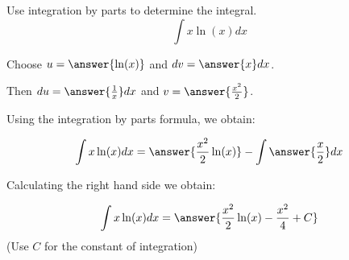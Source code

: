 \documentclass{ximera}
\author{Jason Miller}
\begin{document}
\begin{exercise}
Use integration by parts to determine the integral.
\[
\int x \ln(x) dx 
\]


Choose $u=\answer{ \ln(x) }$ and $dv=\answer{x } dx$. 

Then $du= \answer{ \frac{1}{x} } dx$ and $v= \answer{\frac{x^{2}}{2}}$.

Using the integration by parts formula, we obtain:

\[
\int x \ln(x) dx= \answer{\frac{x^{2}}{2} \ln(x)} - \int \answer{ \frac{x}{2}  } dx
\]

Calculating the right hand side we obtain:

\[
\int x \ln(x) dx= \answer{\frac{x^{2}}{2} \ln(x) -\frac{ x^{2}  }{4}  + C}
\]
(Use $C$ for the constant of integration)

\end{exercise}
\end{document}
